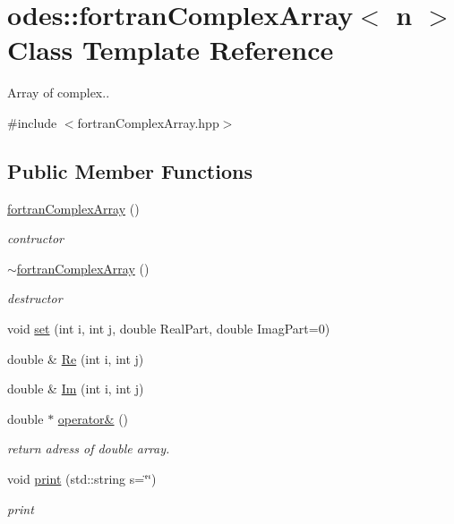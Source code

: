 \hypertarget{classodes_1_1fortranComplexArray}{}\section{odes\+:\+:fortran\+Complex\+Array$<$ n $>$ Class Template Reference}
\label{classodes_1_1fortranComplexArray}


Array of complex..  




{\ttfamily \#include $<$fortran\+Complex\+Array.\+hpp$>$}

\subsection*{Public Member Functions}
\begin{DoxyCompactItemize}
\item 
\hyperlink{classodes_1_1fortranComplexArray_acd4eafac964a25c1d8da0bb6d7b5b4a9}{fortran\+Complex\+Array} ()
\begin{DoxyCompactList}\small\item\em contructor \end{DoxyCompactList}\item 
\hyperlink{classodes_1_1fortranComplexArray_afc9c69b7f395b99f0d206a2a5c807d25}{$\sim$fortran\+Complex\+Array} ()
\begin{DoxyCompactList}\small\item\em destructor \end{DoxyCompactList}\item 
void \hyperlink{classodes_1_1fortranComplexArray_a14b8b642717e5d1baf9bc04084c954c9}{set} (int i, int j, double Real\+Part, double Imag\+Part=0)
\item 
double \& \hyperlink{classodes_1_1fortranComplexArray_a4b44f77e725c75927054dda1e22c5b7e}{Re} (int i, int j)
\item 
double \& \hyperlink{classodes_1_1fortranComplexArray_a75d7b02f01d3155a6d127f76cf657401}{Im} (int i, int j)
\item 
double $\ast$ \hyperlink{classodes_1_1fortranComplexArray_aa5c13e2bf65b68a05e631cc09a755f80}{operator\&} ()
\begin{DoxyCompactList}\small\item\em return adress of double array. \end{DoxyCompactList}\item 
void \hyperlink{classodes_1_1fortranComplexArray_ab0f1691982089c6fa72207a07c847898}{print} (std\+::string s=\char`\"{}\char`\"{})
\begin{DoxyCompactList}\small\item\em print \end{DoxyCompactList}\end{DoxyCompactItemize}
